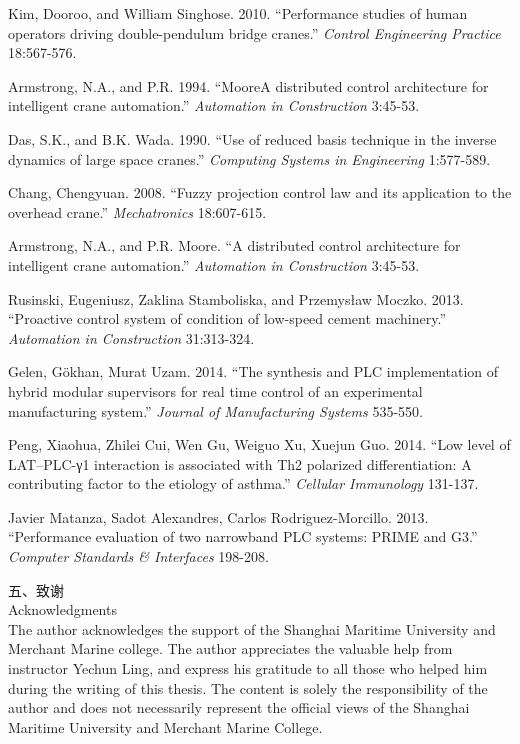 \documentclass[a4paper]{article}
\renewcommand{\Large}{\fontsize{12pt}{\baselineskip}\selectfont}
\begin{document}
\setlength{\hangindent}{4em}
Kim, Dooroo, and William Singhose. 2010. ``Performance studies of human operators driving double-pendulum bridge cranes.''
\textit{Control Engineering Practice} 18:567-576. \par

\setlength{\hangindent}{4em}
Armstrong, N.A., and P.R. 1994. ``MooreA distributed control architecture for intelligent crane automation.''
\textit{Automation in Construction} 3:45-53. \par

\setlength{\hangindent}{4em}
Das, S.K., and B.K. Wada. 1990. ``Use of reduced basis technique in the inverse dynamics of large space cranes.''
\textit{Computing Systems in Engineering} 1:577-589. \par

\setlength{\hangindent}{4em}
Chang, Chengyuan. 2008. ``Fuzzy projection control law and its application to the overhead crane.''
\textit{Mechatronics} 18:607-615. \par

\setlength{\hangindent}{4em}
Armstrong, N.A., and P.R. Moore. ``A distributed control architecture for intelligent crane automation.''
\textit{Automation in Construction} 3:45-53. \par

\setlength{\hangindent}{4em}
Rusinski, Eugeniusz, Zaklina Stamboliska, and Przemysław Moczko. 2013. ``Proactive control system of condition of low-speed cement machinery.''
\textit{Automation in Construction} 31:313-324. \par

\setlength{\hangindent}{4em}
Gelen, Gökhan, Murat Uzam. 2014. ``The synthesis and PLC implementation of hybrid modular supervisors for real time control of an experimental manufacturing system.''
\textit{Journal of Manufacturing Systems} 535-550. \par

\setlength{\hangindent}{4em}
Peng, Xiaohua, Zhilei Cui, Wen Gu, Weiguo Xu, Xuejun Guo. 2014. ``Low level of LAT–PLC-γ1 interaction is associated with Th2 polarized differentiation: A contributing factor to the etiology of asthma.''
\textit{Cellular Immunology} 131-137. \par

\setlength{\hangindent}{4em}
Javier Matanza, Sadot Alexandres, Carlos Rodriguez-Morcillo. 2013. ``Performance evaluation of two narrowband PLC systems: PRIME and G3.''
\textit{Computer Standards \& Interfaces} 198-208. \par

{ \Large 五、致谢} \\
{ \Large Acknowledgments} \\
The author acknowledges the support of the Shanghai Maritime
University and Merchant Marine college. The author appreciates the valuable
help from instructor Yechun Ling, and express his gratitude to all those who helped him
during the writing of this thesis. The content is solely the responsibility of the author and
does not necessarily represent the official views of the Shanghai Maritime University
and Merchant Marine College.
\end{document}
